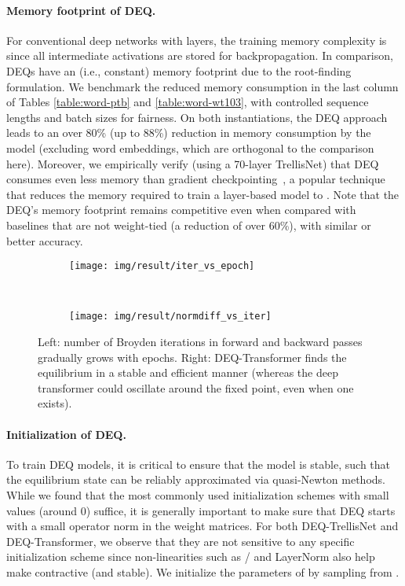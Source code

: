 \documentclass{article}
\begin{document}
\paragraph{Memory footprint of DEQ.} For conventional deep networks with  layers, the training memory complexity is  since all intermediate activations are stored for backpropagation. In comparison, DEQs have an  (i.e., constant) memory footprint due to the root-finding formulation. We benchmark the reduced memory consumption in the last column of Tables \ref{table:word-ptb} and \ref{table:word-wt103}, with controlled sequence lengths and batch sizes for fairness. On both instantiations, the DEQ approach leads to an over 80\% (up to 88\%) reduction in memory consumption by the model (excluding word embeddings, which are orthogonal to the comparison here). Moreover, we empirically verify (using a 70-layer TrellisNet) that DEQ consumes even less memory than gradient checkpointing~\citep{chen2016training}, a popular technique that reduces the memory required to train a layer-based model to . Note that the DEQ's memory footprint remains competitive even when compared with baselines that are not weight-tied (a reduction of over 60\%), with similar or better accuracy.


\begin{figure}[t]
  \vspace{-2mm}
  \centering
  \begin{subfigure}[b]{0.44\textwidth}
    \texttt{[image: img/result/iter\_vs\_epoch]}
    \vspace{-5mm}
  \end{subfigure}
  ~
  \begin{subfigure}[b]{0.457\textwidth}
    \texttt{[image: img/result/normdiff\_vs\_iter]}
    \vspace{-5mm}
  \end{subfigure}
  \vspace{-1mm}
  \caption{Left: number of Broyden iterations in forward and backward passes gradually grows with epochs. Right: DEQ-Transformer finds the equilibrium in a stable and efficient manner (whereas the deep transformer could oscillate around the fixed point, even when one exists).}
  \label{fig:emp-analysis}
  \vspace{-6mm}
\end{figure}

\vspace{-2mm}
\paragraph{Initialization of DEQ.} To train DEQ models, it is critical to ensure that the model is stable, such that the equilibrium state can be reliably approximated via quasi-Newton methods. While we found that the most commonly used initialization schemes with small values (around 0) suffice, it is generally important to make sure that DEQ starts with a small operator norm in the weight matrices. For both DEQ-TrellisNet and DEQ-Transformer, we observe that they are not sensitive to any specific initialization scheme since non-linearities such as / and LayerNorm also help make  contractive (and stable). We initialize the parameters of  by sampling from .
\end{document}

